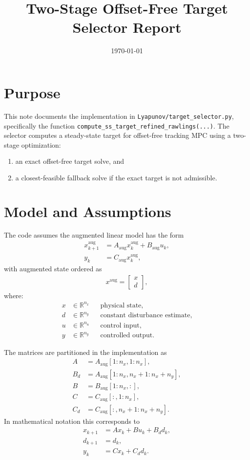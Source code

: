 \documentclass[11pt]{article}
\title{Two-Stage Offset-Free Target Selector Report}
\author{}
\date{\today}
\begin{document}
\maketitle

\section{Purpose}
This note documents the implementation in
\texttt{Lyapunov/target\_selector.py}, specifically the function
\texttt{compute\_ss\_target\_refined\_rawlings(...)}.
The selector computes a steady-state target for offset-free tracking MPC
using a two-stage optimization:
\begin{enumerate}
    \item an exact offset-free target solve, and
    \item a closest-feasible fallback solve if the exact target is not admissible.
\end{enumerate}

\section{Model and Assumptions}
The code assumes the augmented linear model has the form
\begin{align}
    x_{k+1}^{\mathrm{aug}} &= A_{\mathrm{aug}} x_k^{\mathrm{aug}} + B_{\mathrm{aug}} u_k, \\
    y_k &= C_{\mathrm{aug}} x_k^{\mathrm{aug}},
\end{align}
with augmented state ordered as
\begin{align}
    x^{\mathrm{aug}} = \begin{bmatrix} x \\ d \end{bmatrix},
\end{align}
where:
\begin{align}
    x &\in \mathbb{R}^{n_x} && \text{physical state}, \\
    d &\in \mathbb{R}^{n_y} && \text{constant disturbance estimate}, \\
    u &\in \mathbb{R}^{n_u} && \text{control input}, \\
    y &\in \mathbb{R}^{n_y} && \text{controlled output.}
\end{align}

The matrices are partitioned in the implementation as
\begin{align}
    A &= A_{\mathrm{aug}}[1{:}n_x,1{:}n_x], \\
    B_d &= A_{\mathrm{aug}}[1{:}n_x,n_x{+}1{:}n_x{+}n_y], \\
    B &= B_{\mathrm{aug}}[1{:}n_x,:], \\
    C &= C_{\mathrm{aug}}[:,1{:}n_x], \\
    C_d &= C_{\mathrm{aug}}[:,n_x{+}1{:}n_x{+}n_y].
\end{align}
In mathematical notation this corresponds to
\begin{align}
    x_{k+1} &= A x_k + B u_k + B_d d_k, \\
    d_{k+1} &= d_k, \\
    y_k &= C x_k + C_d d_k.
\end{align}
\end{document}
